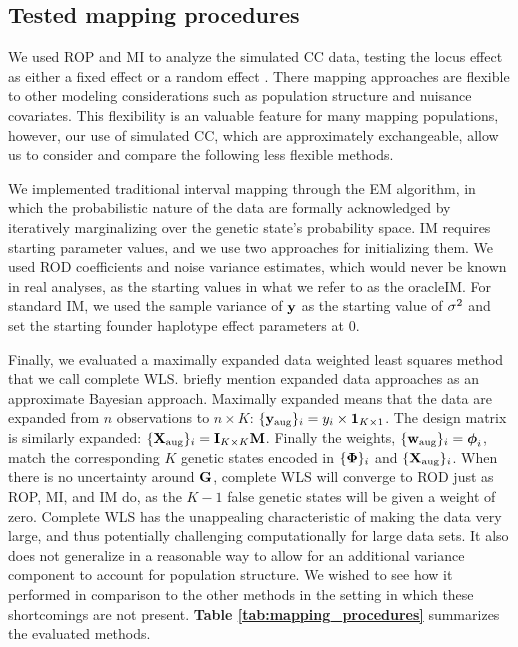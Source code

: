 \subsection{Tested mapping procedures} 

We used ROP and MI to analyze the simulated CC data, testing the locus effect as either a fixed effect or a random effect \citep{Wei2016}. There mapping approaches are flexible to other modeling considerations such as population structure and nuisance covariates. This flexibility is an valuable feature for many mapping populations, however, our use of simulated CC, which are approximately exchangeable, allow us to consider and compare the following less flexible methods.

We implemented traditional interval mapping through the EM algorithm, in which the probabilistic nature of the data are formally acknowledged by iteratively marginalizing over the genetic state's probability space. IM requires starting parameter values, and we use two approaches for initializing them. We used ROD coefficients and noise variance estimates, which would never be known in real analyses, as the starting values in what we refer to as the oracleIM. For standard IM, we used the sample variance of $\mathbf{y}$ as the starting value of $\sigma^{2}$ and set the starting founder haplotype effect parameters at 0. 

Finally, we evaluated a maximally expanded data weighted least squares method that we call complete WLS. \cite{Durrant2010} briefly mention expanded data approaches as an approximate Bayesian approach. Maximally expanded means that the data are expanded from $n$ observations to $n \times K$: $\{\mathbf{y}_{\text{aug}}\}_{i} = y_{i} \times \mathbf{1}_{K \times 1}$. The design matrix is similarly expanded: $\{\mathbf{X}_{\text{aug}}\}_{i} = \mathbf{I}_{K \times K}\mathbf{M}$. Finally the weights, $\{\mathbf{w}_{\text{aug}}\}_{i} = \boldsymbol{\phi}_{i}$, match the corresponding $K$ genetic states encoded in $\{\boldsymbol{\Phi}\}_{i}$ and $\{\mathbf{X}_\text{aug}\}_{i}$. When there is no uncertainty around $\mathbf{G}$, complete WLS will converge to ROD just as ROP, MI, and IM do, as the $K-1$ false genetic states will be given a weight of zero. Complete WLS has the unappealing characteristic of making the data very large, and thus potentially challenging computationally for large data sets. It also does not generalize in a reasonable way to allow for an additional variance component to account for population structure. We wished to see how it performed in comparison to the other methods in the setting in which these shortcomings are not present. \textbf{Table \ref{tab:mapping_procedures}} summarizes the evaluated methods.

